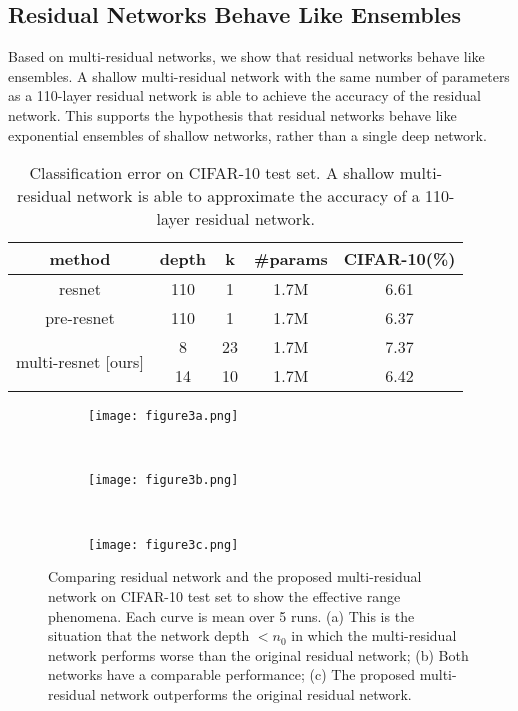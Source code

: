\documentclass[journal]{IEEEtran}
\begin{document}
\subsection{Residual Networks Behave Like Ensembles}


Based on multi-residual networks, we show that residual networks behave like ensembles. A shallow multi-residual network with the same number of parameters as a 110-layer residual network is able to achieve the accuracy of the residual network. This supports the hypothesis that residual networks behave like exponential ensembles of shallow networks, rather than a single deep network.

\begin{table}[!htb]
\centering
\begin{tabular}{||c c c c c ||} 
\hline
method & depth & k & \#params & CIFAR-10(\%)  \\ 
\hline\hline
\multirow{1}{7.5em}{resnet\cite{he2015deep}} 
& 110 & 1& 1.7M & 6.61 \\ 
\hline
\multirow{1}{7.5em}{pre-resnet\cite{he2016identity}} 
& 110 & 1& 1.7M & 6.37 \\ 
\hline
\multirow{2}{7.5em}{multi-resnet [ours]} 
& 8 & 23 & 1.7M & 7.37\\ 
& 14 & 10 & 1.7M & 6.42 \\ 

\hline
\end{tabular}
\caption{Classification error on CIFAR-10 test set. A shallow multi-residual network is able to approximate the accuracy of a 110-layer residual network.}
\label{table:1}
\end{table}


\begin{figure*}[!t]
    \centering
    \begin{subfigure}[b]{0.4\textwidth}
        \texttt{[image: figure3a.png]}
        \caption{}
        \label{fig:a}
    \end{subfigure}
    ~ %
    \begin{subfigure}[b]{0.4\textwidth}
        \texttt{[image: figure3b.png]}
        \caption{}
        \label{fig:b}
    \end{subfigure}
    ~ %
    \begin{subfigure}[b]{0.4\textwidth}
        \texttt{[image: figure3c.png]}
        \caption{}
        \label{fig:c}
    \end{subfigure}
    \caption{Comparing residual network and the proposed multi-residual network on CIFAR-10 test set to show the effective range phenomena. Each curve is mean over 5 runs. (a) This is the situation that the network depth $<n_0$ in which the multi-residual network performs worse than the original residual network; (b) Both networks have a comparable performance; (c) The proposed multi-residual network outperforms the original residual network.}\label{fig:tradeoff}
\end{figure*}
\end{document}
